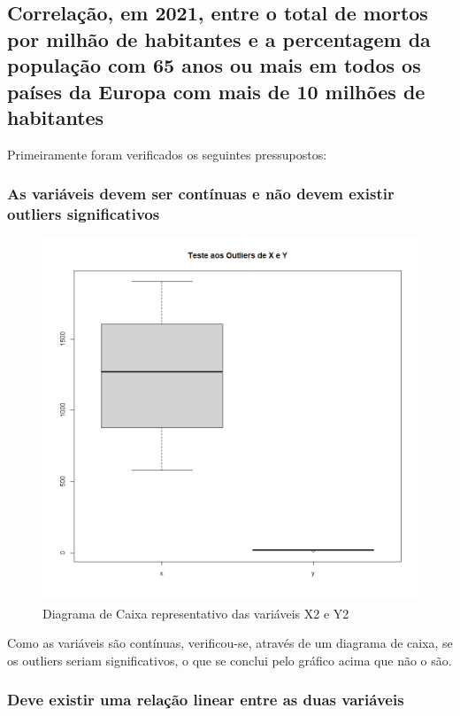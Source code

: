 \documentclass[conference]{IEEEtran}
\begin{document}
\subsection{Correlação, em 2021, entre o total de mortos por milhão de habitantes e a percentagem da população com 65 anos ou mais em todos os países da Europa com mais de 10 milhões de habitantes}

Primeiramente foram verificados os seguintes pressupostos:

\subsubsection{As variáveis devem ser contínuas e não devem existir outliers significativos}

\begin{figure}[htbp]
\centerline{\includegraphics[width=0.95\columnwidth]{images/03.b.1.png}}
\caption{Diagrama de Caixa representativo das variáveis X2 e Y2}
\label{fig}
\end{figure}

Como as variáveis são contínuas, verificou-se, através de um diagrama de caixa, se os outliers seriam significativos, o que se conclui pelo gráfico acima que não o são.

\subsubsection{Deve existir uma relação linear entre as duas variáveis}
\end{document}
